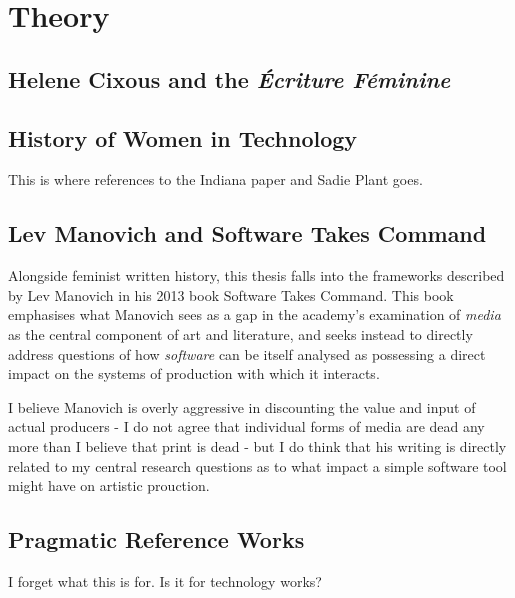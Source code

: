 
\section{Theory}

\subsection{Helene Cixous and the \textit{Écriture Féminine}}


\subsection{History of Women in Technology}
This is where references to the Indiana paper and Sadie Plant goes.

\subsection{Lev Manovich and Software Takes Command}
Alongside feminist written history, this thesis falls into the frameworks described by Lev Manovich in his 2013 book Software Takes Command. This book emphasises what Manovich sees as a gap in the academy's examination of \textit{media} as the central component of art and literature, and seeks instead to directly address questions of how \textit{software} can be itself analysed as possessing a direct impact on the systems of production with which it interacts.

I believe Manovich is overly aggressive in discounting the value and input of actual producers - I do not agree that individual forms of media are dead any more than I believe that print is dead - but I do think that his writing is directly related to my central research questions as to what impact a simple software tool might have on artistic prouction.

\subsection{Pragmatic Reference Works}
I forget what this is for. Is it for technology works?

